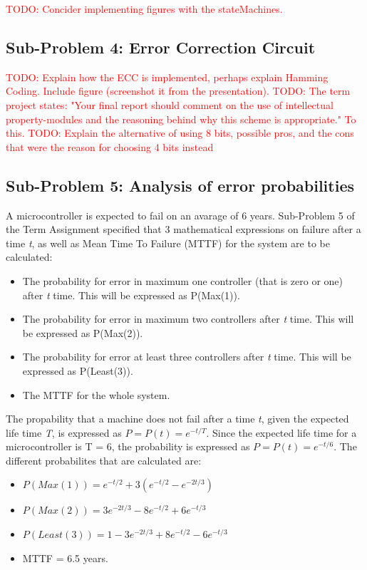 \documentclass[a4paper]{IEEEtran}
\newcommand\TODO[1]{\textcolor{red}{TODO:#1}}
\newcommand\todo[1]{\TODO{#1}}
\begin{document}
\todo{ Concider implementing figures with the stateMachines.}

\subsection{Sub-Problem 4: Error Correction Circuit}
\todo{ Explain how the ECC is implemented, perhaps explain Hamming Coding. Include figure (screenshot it from the presentation). }
\break
\break
\todo{ The term project states: "Your final report should comment on the use of intellectual property-modules and the reasoning behind why this scheme is appropriate." To this.}
\break
\break
\todo{ Explain the alternative of using 8 bits, possible pros, and the cons that were the reason for choosing 4 bits instead} 
\break
\break

\subsection{Sub-Problem 5: Analysis of error probabilities}
A microcontroller is expected to fail on an avarage of 6 years.
Sub-Problem 5 of the Term Assignment specified that 3 mathematical expressions on failure after a time \textit{t}, as well as Mean Time To Failure (MTTF) for the system are to be calculated:
\begin{itemize}
    \item The probability for error in maximum one controller (that is zero or one) after \textit{t} time. This will be expressed as P(Max(1)). 
    \item The probability for error in maximum two controllers after \textit{t} time. This will be expressed as P(Max(2)).
    \item The probability for error at least three controllers after \textit{t} time. This will be expressed as P(Least(3)).
    \item The MTTF for the whole system.
\end{itemize}

The propability that a machine does not fail after a time \textit{t}, given the expected life time \textit{T}, is expressed as $P = P(t) = e^{-t/T}$.
Since the expected life time for a microcontroller is T = 6, the probability is expressed as $P = P(t) = e^{-t/6}$. 
The different probabilites that are calculated are:
\begin{itemize}
    \item $P(Max(1)) = e^{-t/2}+3(e^{-t/2}-e^{-2t/3})$
    \item $P(Max(2)) = 3e^{-2t/3}-8e^{-t/2}+6e^{-t/3}$
    \item $P(Least(3)) = 1-3e^{-2t/3}+8e^{-t/2}-6e^{-t/3}$
    \item MTTF = 6.5 years.
\end{itemize}
\end{document}
